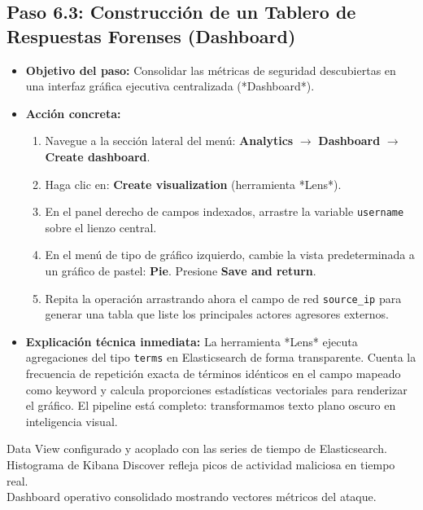 \documentclass[
  coursetitle={Cómputo Nube y Tecnologías Emergentes},
  coursehours={96},
  coursedate={Verano 2026},
  doctype={Práctica},
  otherlangs={english,french},
  authorname={Lázaro},
  authorsurname={Bustio-Martínez},
  authortitle={PhD},
  role={Profesor Investigador},
  email={lbustio@inaoe.mx},
  phone={5559504000},
  ext={7459},
  institution={Instituto Nacional de Astrofísica, Óptica y Electrónica (INAOE)},
  department={Maestría en Ciencias en Tecnologías de Seguridad},
  address={Luis Enrique Erro 1, Sta. Ma. Tonantzintla, San Andrés Cholula, CP 72840, Puebla, México},
  margin={0.5in}
]{../../lbustio_lecture_notes}
\begin{document}
\subsection{Paso 6.3: Construcción de un Tablero de Respuestas Forenses (Dashboard)}
\begin{itemize}
    \item \textbf{Objetivo del paso:} Consolidar las métricas de seguridad descubiertas en una interfaz gráfica ejecutiva centralizada (*Dashboard*).
    \item \textbf{Acción concreta:}
    \begin{enumerate}
        \item Navegue a la sección lateral del menú: \textbf{Analytics} $\rightarrow$ \textbf{Dashboard} $\rightarrow$ \textbf{Create dashboard}.
        \item Haga clic en: \textbf{Create visualization} (herramienta *Lens*).
        \item En el panel derecho de campos indexados, arrastre la variable \texttt{username} sobre el lienzo central.
        \item En el menú de tipo de gráfico izquierdo, cambie la vista predeterminada a un gráfico de pastel: \textbf{Pie}. Presione \textbf{Save and return}.
        \item Repita la operación arrastrando ahora el campo de red \texttt{source\_ip} para generar una tabla que liste los principales actores agresores externos.
    \end{enumerate}

    \item \textbf{Explicación técnica inmediata:} La herramienta *Lens* ejecuta agregaciones del tipo \texttt{terms} en Elasticsearch de forma transparente. Cuenta la frecuencia de repetición exacta de términos idénticos en el campo mapeado como keyword y calcula proporciones estadísticas vectoriales para renderizar el gráfico. El pipeline está completo: transformamos texto plano oscuro en inteligencia visual.
\end{itemize}

\begin{tcolorbox}[colback=green!5!white,colframe=green!60!black,title=\textbf{Checkpoint de Validación Final}]
\checkmark Data View configurado y acoplado con las series de tiempo de Elasticsearch.\\
\checkmark Histograma de Kibana Discover refleja picos de actividad maliciosa en tiempo real.\\
\checkmark Dashboard operativo consolidado mostrando vectores métricos del ataque.
\end{tcolorbox}
\end{document}
